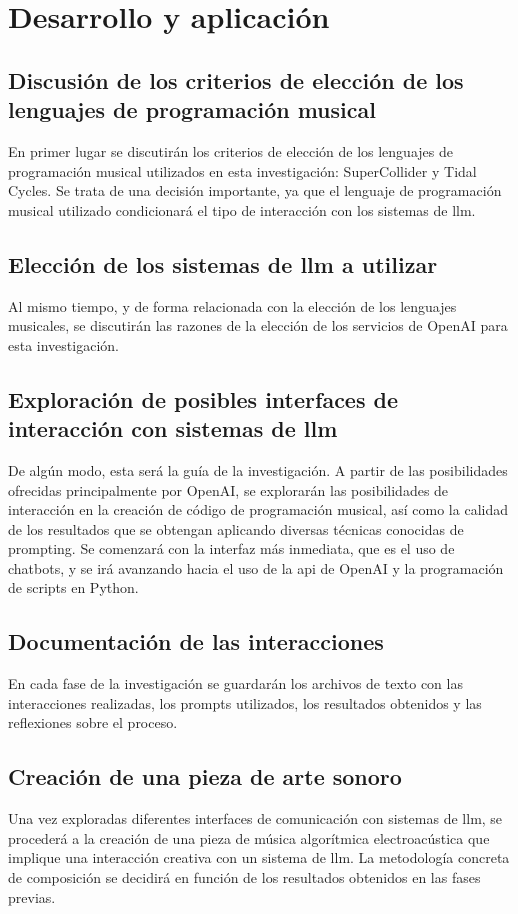 \section{Desarrollo y aplicación}

\subsection{Discusión de los criterios de elección de los lenguajes de programación musical}
En primer lugar se discutirán los criterios de elección de los lenguajes de programación musical utilizados en esta investigación: SuperCollider y Tidal Cycles. Se trata de una decisión importante, ya que el lenguaje de programación musical utilizado condicionará el tipo de interacción con los sistemas de \gls{llm}.

\subsection{Elección de los sistemas de \gls{llm} a utilizar}
Al mismo tiempo, y de forma relacionada con la elección de los lenguajes musicales, se discutirán las razones de la elección de los servicios de OpenAI para esta investigación.


\subsection{Exploración de posibles interfaces de interacción con sistemas de \gls{llm}}
De algún modo, esta será la guía de la investigación. A partir de las posibilidades  ofrecidas principalmente por OpenAI, se explorarán las posibilidades de interacción en la creación de código de programación musical, así como la calidad de los resultados que se obtengan aplicando diversas técnicas conocidas de prompting. Se comenzará con la interfaz más inmediata, que es el uso de chatbots, y se irá avanzando hacia el uso de la \gls{api} de OpenAI y la programación de scripts en Python.


\subsection{Documentación de las interacciones}
En cada fase de la investigación se guardarán los archivos de texto con las interacciones realizadas, los prompts utilizados, los resultados obtenidos y las reflexiones sobre el proceso.

\subsection{Creación de una pieza de arte sonoro}
Una vez exploradas diferentes interfaces de comunicación con sistemas de \gls{llm}, se procederá a la creación de una pieza de música algorítmica electroacústica que implique una interacción creativa con un sistema de \gls{llm}. La metodología concreta de composición se decidirá en función de los resultados obtenidos en las fases previas.

